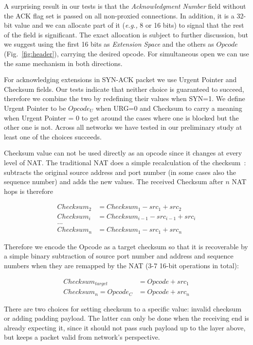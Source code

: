 \documentclass{sig-alternate-10pt}
\providecommand{\eg}{\emph{e.g.,} }
\begin{document}
A surprising result in our tests is that the \emph{Acknowledgment Number} field without the ACK flag set is passed on all non-proxied connections. In addition, it is a 32-bit value and we can allocate part of it (\eg 8 or 16 bits) to signal that the rest of the field is significant. The exact allocation is subject to further discussion, but we suggest using the first 16 bits as \emph{Extension Space} and the others as $Opcode$ (Fig.~\ref{fig:header}), carrying the desired opcode. For simultaneous open we can use the same mechanism in both directions.

For acknowledging extensions in SYN-ACK packet we use Urgent Pointer and Checksum fields. Our tests indicate that neither choice is guaranteed to succeed, therefore we combine the two by redefining their values when SYN=1. We define Urgent Pointer to be $Opcode_U$ when URG=0 and Checksum to carry a meaning when Urgent Pointer = 0 to get around the cases where one is blocked but the other one is not. Across all networks we have tested in our preliminary study at least one of the choices succeeds.

Checksum value can not be used directly as an opcode since it changes at every level of NAT. The traditional NAT does a simple recalculation of the checksum~\cite{Egevang:tu}: subtracts the original source address and port number (in some cases also the sequence number) and adds the new values. The received Checksum after \(n\) NAT hops is therefore

\begin{align*}
Checksum_2 & = Checksum_1 - src_1 + src_2 \\
Checksum_i & = Checksum_{i-1} - src_{i-1} + src_i \\
 ... \\
Checksum_n & = Checksum_1 - src_1 + src_n
\end{align*}

Therefore we encode the Opcode as a target checksum so that it is recoverable by a simple binary subtraction of source port number and address and sequence numbers when they are remapped by the NAT (3-7 16-bit operations in total): 

\begin{align*}
Checksum_{target} & = Opcode + src_1 \\
Checksum_n = Opcode_C & = Opcode + src_n
\end{align*}

There are two choices for setting checksum to a specific value: invalid checksum or adding padding payload. The latter can only be done when the receiving end is already expecting it, since it should not pass such payload up to the layer above, but keeps a packet valid from network's perspective.
\end{document}
